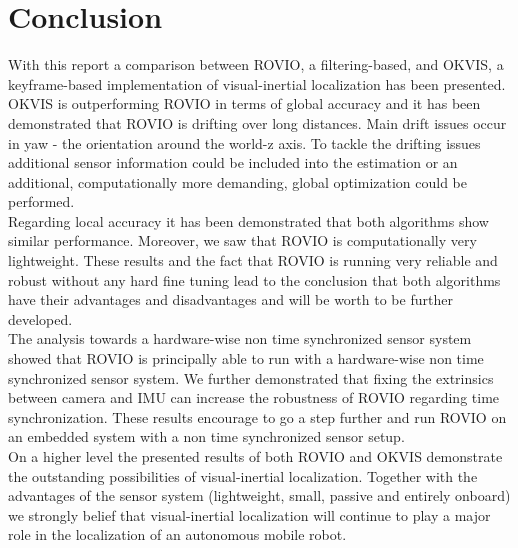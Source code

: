 \chapter{Conclusion}
\label{sec:conclusion}

With this report a comparison between ROVIO, a filtering-based, and OKVIS, a keyframe-based implementation of visual-inertial localization has been presented. OKVIS is outperforming ROVIO in terms of global accuracy and it has been demonstrated that ROVIO is drifting over long distances. Main drift issues occur in yaw - the orientation around the world-z axis. To tackle the drifting issues additional sensor information could be included into the estimation or an additional, computationally more demanding, global optimization could be performed. \\

Regarding local accuracy it has been demonstrated that both algorithms show similar performance. Moreover, we saw that ROVIO is computationally very lightweight. These results and the fact that ROVIO is running very reliable and robust without any hard fine tuning lead to the conclusion that both algorithms have their advantages and disadvantages and will be worth to be further developed. \\

The analysis towards a hardware-wise non time synchronized sensor system showed that ROVIO is principally able to run with a hardware-wise non time synchronized sensor system. We further demonstrated that fixing the extrinsics between camera and IMU can increase the robustness of ROVIO regarding time synchronization. These results encourage to go a step further and run ROVIO on an embedded system with a non time synchronized sensor setup. \\

On a higher level the presented results of both ROVIO and OKVIS demonstrate the outstanding possibilities of visual-inertial localization. Together with the advantages of the sensor system (lightweight, small, passive and entirely onboard) we strongly belief that visual-inertial localization will continue to play a major role in the localization of an autonomous mobile robot.

